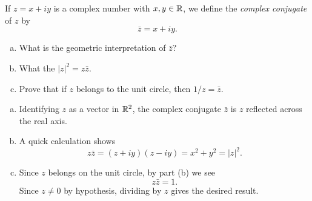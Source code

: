 \begin{exrc}[2]
    If \(z = x + iy\) is a complex number with \(x, y \in \mathbb{R}\),
    we define the \emph{complex conjugate} of \(z\) by
    \begin{equation*}
        \bar{z} = x + iy.
    \end{equation*}
    \begin{enumerate}[(a)]
    \item
        What is the geometric interpretation of \(\bar{z}\)?

    \item
        What the \(|z|^2 = z \bar{z}\).

    \item
        Prove that if \(z\) belongs to the unit circle, then \(1 / z = \bar{z}\).
    \end{enumerate}

\begin{soln}
    \begin{enumerate}[(a)]
    \item
        Identifying \(z\) as a vector in \(\mathbb{R}^2\),
        the complex conjugate \(\bar{z}\)
        is \(z\) reflected across the real axis.

    \item
        A quick calculation shows
        \begin{equation*}
            z \bar{z} = (z + iy)(z - iy) = x^2 + y^2 = |z|^2.
        \end{equation*}

    \item
        Since \(z\) belongs on the unit circle,
        by part (b) we see
        \begin{equation*}
            z \bar{z} = 1.
        \end{equation*}
        Since \(z \neq 0\) by hypothesis,
        dividing by \(z\) gives the desired result.

    \end{enumerate}

\end{soln}
\end{exrc}
